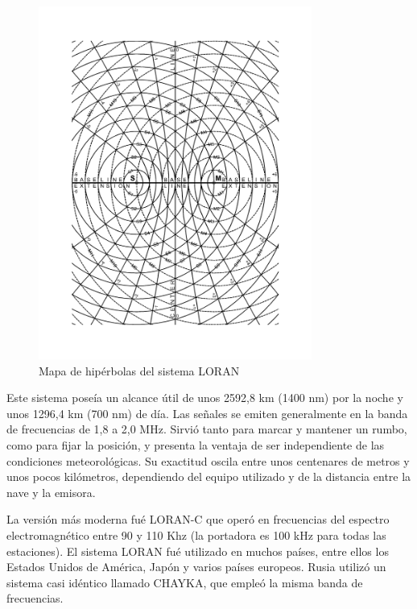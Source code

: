 \begin{figure}[!h]
  \centering
  \includegraphics[width=0.8\textwidth , angle=90]{06.radionavegacion/Imagenes/06.01.adf/hypnavig.pdf}
  \caption{Mapa de hip\'erbolas del sistema LORAN }
  \label{fig:LORAN_hiperbolas}
\end{figure}


Este sistema pose\'ia un alcance \'util de unos 2592,8 km (1400 nm) por la noche y unos 1296,4 km (700 nm) de d\'ia. Las se\~nales se emiten generalmente en la banda de frecuencias de 1,8 a 2,0 MHz. Sirvi\'o tanto para marcar y mantener un rumbo, como para fijar la posici\'on, y presenta la ventaja de ser independiente de las condiciones meteorol\'ogicas. Su exactitud oscila entre unos centenares de metros y unos pocos kil\'ometros, dependiendo del equipo utilizado y de la distancia entre la nave y la emisora. 

La versi\'on m\'as moderna fu\'e LORAN-C que oper\'o en frecuencias del espectro electromagn\'etico entre 90 y 110 Khz (la portadora es 100 kHz para todas las estaciones). El sistema LORAN fu\'e utilizado en muchos pa\'ises, entre ellos los Estados Unidos de Am\'erica, Jap\'on y varios pa\'ises europeos. Rusia utiliz\'o un sistema casi id\'entico llamado CHAYKA, que emple\'o la misma banda de frecuencias. 

